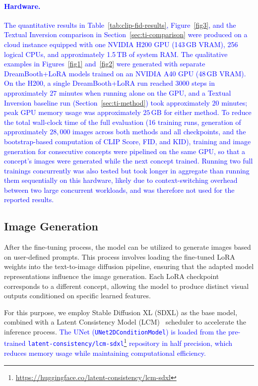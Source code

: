 \documentclass[pdflatex,sn-mathphys-num]{sn-jnl}%
\theoremstyle{thmstyleone}%
\theoremstyle{thmstyletwo}%
\theoremstyle{thmstylethree}%
\begin{document}
\paragraph*{\textcolor{blue}{Hardware.}}
\textcolor{blue}{The quantitative results in Table~\ref{tab:clip-fid-results}, Figure~\ref{fig3}, and the Textual Inversion comparison in Section~\ref{sec:ti-comparison} were produced on a cloud instance equipped with one NVIDIA H200 GPU (143\,GB VRAM), 256 logical CPUs, and approximately 1.5\,TB of system RAM. The qualitative examples in Figures~\ref{fig1} and~\ref{fig2} were generated with separate DreamBooth+LoRA models trained on an NVIDIA A40 GPU (48\,GB VRAM). On the H200, a single DreamBooth+LoRA run reached $3000$ steps in approximately $27$ minutes when running alone on the GPU, and a Textual Inversion baseline run (Section~\ref{sec:ti-method}) took approximately $20$ minutes; peak GPU memory usage was approximately $25$\,GB for either method. To reduce the total wall-clock time of the full evaluation (16 training runs, generation of approximately $28{,}000$ images across both methods and all checkpoints, and the bootstrap-based computation of CLIP Score, FID, and KID), training and image generation for consecutive concepts were pipelined on the same GPU, so that a concept's images were generated while the next concept trained. Running two full trainings concurrently was also tested but took longer in aggregate than running them sequentially on this hardware, likely due to context-switching overhead between two large concurrent workloads, and was therefore not used for the reported results.}


\subsection{Image Generation}
\label{sec:generation}
After the fine-tuning process, the model can be utilized to generate images based on user-defined prompts. This process involves loading the fine-tuned LoRA weights into the text-to-image diffusion pipeline, ensuring that the adapted model representations influence the image generation. Each LoRA checkpoint corresponds to a different concept, allowing the model to produce distinct visual outputs conditioned on specific learned features.

For this purpose, we employ Stable Diffusion XL (SDXL) as the base model, combined with a Latent Consistency Model (LCM)~\cite{luo2023latent} scheduler to accelerate the inference process. \textcolor{blue}{The UNet (\texttt{UNet2DConditionModel}) is loaded from the pre-trained \texttt{latent-consistency/lcm-sdxl}\footnote{\url{https://huggingface.co/latent-consistency/lcm-sdxl}} repository in half precision, which reduces memory usage while maintaining computational efficiency.}
\end{document}
